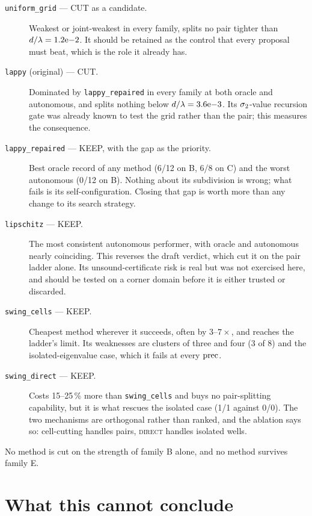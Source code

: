 \begin{description}
\item[\texttt{uniform\_grid} --- CUT as a candidate.] Weakest or joint-weakest in every family,
splits no pair tighter than $d/\lambda = 1.2\mathrm{e}{-2}$. It should be retained as the control
that every proposal must beat, which is the role it already has.

\item[\texttt{lappy} (original) --- CUT.] Dominated by \texttt{lappy\_repaired} in every family
at both oracle and autonomous, and splits nothing below $d/\lambda = 3.6\mathrm{e}{-3}$. Its
$\sigma_2$-value recursion gate was already known to test the grid rather than the pair; this
measures the consequence.

\item[\texttt{lappy\_repaired} --- KEEP, with the gap as the priority.] Best oracle record of
any method (6/12 on B, 6/8 on C) and the worst autonomous (0/12 on B). Nothing about its
subdivision is wrong; what fails is its self-configuration. Closing that gap is worth more than
any change to its search strategy.

\item[\texttt{lipschitz} --- KEEP.] The most consistent autonomous performer, with oracle and
autonomous nearly coinciding. This reverses the draft verdict, which cut it on the pair ladder
alone. Its unsound-certificate risk is real but was not exercised here, and should be tested on
a corner domain before it is either trusted or discarded.

\item[\texttt{swing\_cells} --- KEEP.] Cheapest method wherever it succeeds, often by
$3$--$7\times$, and reaches the ladder's limit. Its weaknesses are clusters of three and four
(3 of 8) and the isolated-eigenvalue case, which it fails at every $\mathrm{prec}$.

\item[\texttt{swing\_direct} --- KEEP.] Costs 15--25\,\% more than \texttt{swing\_cells} and
buys no pair-splitting capability, but it is what rescues the isolated case (1/1 against 0/0).
The two mechanisms are orthogonal rather than ranked, and the ablation says so: cell-cutting
handles pairs, \textsc{direct} handles isolated wells.
\end{description}

\noindent
No method is cut on the strength of family B alone, and no method survives family E.

\section{What this cannot conclude}

